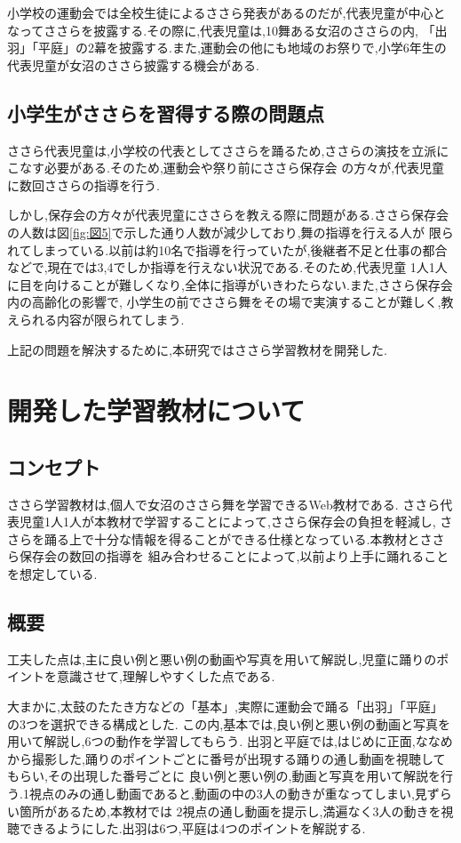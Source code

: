 \documentclass[12pt]{ltjsarticle}
\begin{document}
小学校の運動会では全校生徒によるささら発表があるのだが,代表児童が中心となってささらを披露する.その際に,代表児童は,10舞ある女沼のささらの内,
「出羽」「平庭」の2幕を披露する.また,運動会の他にも地域のお祭りで,小学6年生の代表児童が女沼のささら披露する機会がある.



\subsection{小学生がささらを習得する際の問題点}
ささら代表児童は,小学校の代表としてささらを踊るため,ささらの演技を立派にこなす必要がある.そのため,運動会や祭り前にささら保存会
の方々が,代表児童に数回ささらの指導を行う.

しかし,保存会の方々が代表児童にささらを教える際に問題がある.ささら保存会の人数は図\ref{fig:図5}で示した通り人数が減少しており,舞の指導を行える人が
限られてしまっている.以前は約10名で指導を行っていたが,後継者不足と仕事の都合などで,現在では3,4でしか指導を行えない状況である.そのため,代表児童
1人1人に目を向けることが難しくなり,全体に指導がいきわたらない.また,ささら保存会内の高齢化の影響で,
小学生の前でささら舞をその場で実演することが難しく,教えられる内容が限られてしまう.

上記の問題を解決するために,本研究ではささら学習教材を開発した.
\newpage
\section{開発した学習教材について}
\subsection{コンセプト}
ささら学習教材は,個人で女沼のささら舞を学習できるWeb教材である.
ささら代表児童1人1人が本教材で学習することによって,ささら保存会の負担を軽減し,
ささらを踊る上で十分な情報を得ることができる仕様となっている.本教材とささら保存会の数回の指導を
組み合わせることによって,以前より上手に踊れることを想定している.

\subsection{概要}
工夫した点は,主に良い例と悪い例の動画や写真を用いて解説し,児童に踊りのポイントを意識させて,理解しやすくした点である.

大まかに,太鼓のたたき方などの「基本」,実際に運動会で踊る「出羽」「平庭」の3つを選択できる構成とした.
この内,基本では,良い例と悪い例の動画と写真を用いて解説し,6つの動作を学習してもらう.
出羽と平庭では,はじめに正面,ななめから撮影した,踊りのポイントごとに番号が出現する踊りの通し動画を視聴してもらい,その出現した番号ごとに
良い例と悪い例の,動画と写真を用いて解説を行う.1視点のみの通し動画であると,動画の中の3人の動きが重なってしまい,見ずらい箇所があるため,本教材では
2視点の通し動画を提示し,満遍なく3人の動きを視聴できるようにした.出羽は6つ,平庭は4つのポイントを解説する.
\end{document}
